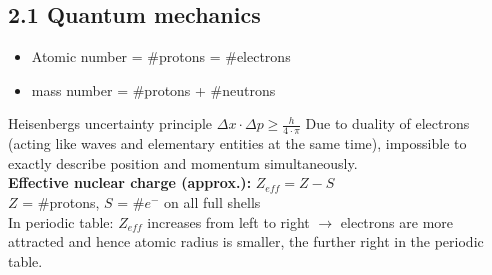 \begin{multicols*}{4}
\subsection{2.1 Quantum mechanics}{
    \begin{itemize}[noitemsep, leftmargin=*]
        \item Atomic number = \#protons = \#electrons
        \item mass number = \#protons + \#neutrons
    \end{itemize}
    Heisenbergs uncertainty principle $\Delta x \cdot \Delta p \geq \frac{h}{4 \cdot \pi}$ Due to duality of electrons (acting like waves and elementary entities at the same time), impossible to exactly describe position and momentum simultaneously.\\
    \textbf{Effective nuclear charge (approx.):}   $Z_{eff} = Z-S$\\
    $Z$ = \#protons, $S$ = \#$e^-$ on all full shells
    \vspace{1mm}\\
	In periodic table: $Z_{eff}$ increases from left to right $\rightarrow$ electrons are more attracted and hence atomic radius is smaller, the further right in the periodic table. 
}



\end{multicols*}
